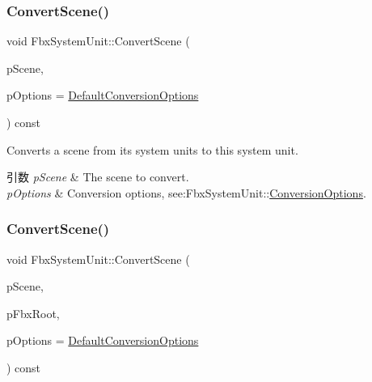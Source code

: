 \subsubsection{\texorpdfstring{Convert\+Scene()}{ConvertScene()}\hspace{0.1cm}{\footnotesize\ttfamily [1/2]}}
{\footnotesize\ttfamily void Fbx\+System\+Unit\+::\+Convert\+Scene (\begin{DoxyParamCaption}\item[{\hyperlink{class_fbx_scene}{Fbx\+Scene} $\ast$}]{p\+Scene,  }\item[{const \hyperlink{struct_fbx_system_unit_1_1_conversion_options}{Conversion\+Options} \&}]{p\+Options = {\ttfamily \hyperlink{class_fbx_system_unit_ae76376923416767b2a5f6a7e4e663064}{Default\+Conversion\+Options}} }\end{DoxyParamCaption}) const}

Converts a scene from its system units to this system unit. 
\begin{DoxyParams}{引数}
{\em p\+Scene} & The scene to convert. \\
\hline
{\em p\+Options} & Conversion options, see\+:\+Fbx\+System\+Unit\+:\+:\hyperlink{struct_fbx_system_unit_1_1_conversion_options}{Conversion\+Options}. \\
\hline
\end{DoxyParams}
\mbox{\label{class_fbx_system_unit_a29b302d74518106bdc5e2d21ee687e09}} 
\subsubsection{\texorpdfstring{Convert\+Scene()}{ConvertScene()}\hspace{0.1cm}{\footnotesize\ttfamily [2/2]}}
{\footnotesize\ttfamily void Fbx\+System\+Unit\+::\+Convert\+Scene (\begin{DoxyParamCaption}\item[{\hyperlink{class_fbx_scene}{Fbx\+Scene} $\ast$}]{p\+Scene,  }\item[{\hyperlink{class_fbx_node}{Fbx\+Node} $\ast$}]{p\+Fbx\+Root,  }\item[{const \hyperlink{struct_fbx_system_unit_1_1_conversion_options}{Conversion\+Options} \&}]{p\+Options = {\ttfamily \hyperlink{class_fbx_system_unit_ae76376923416767b2a5f6a7e4e663064}{Default\+Conversion\+Options}} }\end{DoxyParamCaption}) const}

